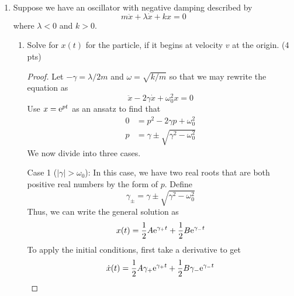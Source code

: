 \documentclass[../psets.tex]{subfiles}
\begin{document}
\begin{enumerate}
\begin{enumerate}
\begin{proof}
            As $t\to\infty$, $\e[-kt/m]\to 0$, leaving
            \begin{equation*}
                \boxed{\dot{x}_f = \frac{mg}{k}}
            \end{equation*}
            Note that this velocity is pointing down.
        \end{proof}
    \end{enumerate}
    \item Suppose we have an oscillator with negative damping described by
    \begin{equation*}
        m\ddot{x}+\lambda\dot{x}+kx = 0
    \end{equation*}
    where $\lambda<0$ and $k>0$.
    \begin{enumerate}
        \item Solve for $x(t)$ for the particle, if it begins at velocity $v$ at the origin. (4 pts)
        \begin{proof}
            Let $-\gamma=\lambda/2m$ and $\omega=\sqrt{k/m}$ so that we may rewrite the equation as
            \begin{equation*}
                \ddot{x}-2\gamma\dot{x}+\omega_0^2x = 0
            \end{equation*}
            Use $x=\e[pt]$ as an ansatz to find that
            \begin{align*}
                0 &= p^2-2\gamma p+\omega_0^2\\
                p &= \gamma\pm\sqrt{\gamma^2-\omega_0^2}
            \end{align*}
            We now divide into three cases.\par
            Case 1 ($|\gamma|>\omega_0$): In this case, we have two real roots that are both positive real numbers by the form of $p$. Define
            \begin{equation*}
                \gamma_\pm = \gamma\pm\sqrt{\gamma^2-\omega_0^2}
            \end{equation*}
            Thus, we can write the general solution as
            \begin{equation*}
                x(t) = \frac{1}{2}A\e[\gamma_+t]+\frac{1}{2}B\e[\gamma_-t]
            \end{equation*}
            To apply the initial conditions, first take a derivative to get
            \begin{equation*}
                \dot{x}(t) = \frac{1}{2}A\gamma_+\e[\gamma_+t]+\frac{1}{2}B\gamma_-\e[\gamma_-t]
            \end{equation*}

\end{proof}
\end{enumerate}
\end{enumerate}
\end{document}
